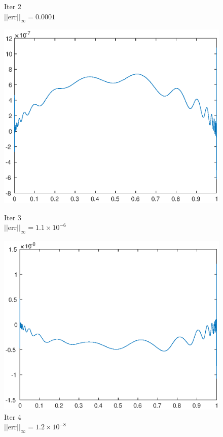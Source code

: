 \documentclass[lang=cn,10pt]{elegantbook}
\begin{document}
\begin{figure}[H]
\begin{minipage}[t]{0.24\linewidth}
    \caption*{\small Iter 2 \\ $||\text{err}||_\infty=0.0001$}
  \end{minipage}
  \begin{minipage}[t]{0.24\linewidth}
    \centering
    \includegraphics[width=0.9\linewidth]{figure/1-4-3.eps}
    \caption*{\small Iter 3 \\ $||\text{err}||_\infty=1.1\times 10^{-6}$}
  \end{minipage}
  \begin{minipage}[t]{0.24\linewidth}
    \centering
    \includegraphics[width=0.9\linewidth]{figure/1-4-4.eps}
    \caption*{\small Iter 4 \\ $||\text{err}||_\infty=1.2\times 10^{-8}$}
  \end{minipage}
\end{figure}
\end{document}
